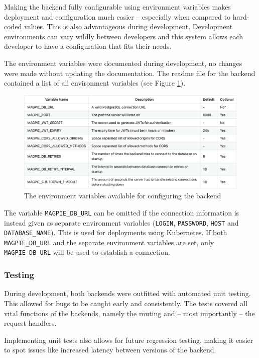 Making the backend fully configurable using environment variables makes
deployment and configuration much easier -- especially when compared to
hard-coded values. This is also advantageous during development. Development
environments can vary wildly between developers and this system allows each
developer to have a configuration that fits their needs.

The environment variables were documented during development, no changes were
made without updating the documentation. The readme file for the backend
contained a list of all environment variables (see Figure
\ref{fig:backend_env}).

\begin{figure}[htbp]
  \centering{}
  \includegraphics[width=\textwidth]{images/backend_env.png}
  \caption{The environment variables available for configuring the backend}
  \label{fig:backend_env}
\end{figure}

The variable \texttt{MAGPIE\_DB\_URL} can be omitted if the connection information
is instead given as separate environment variables (\texttt{LOGIN},
\texttt{PASSWORD}, \texttt{HOST} and \texttt{DATABASE\_NAME}). This is used for
deployments using Kubernetes. If both \texttt{MAGPIE\_DB\_URL} and the separate
environment variables are set, only \texttt{MAGPIE\_DB\_URL} will be used to
establish a connection.

\subsubsection{Testing}
During development, both backends were outfitted with automated unit testing.
This allowed for bugs to be caught early and consistently. The tests covered all
vital functions of the backends, namely the routing and -- most importantly --
the request handlers.

Implementing unit tests also allows for future regression testing, making it
easier to spot issues like increased latency between versions of the backend.

